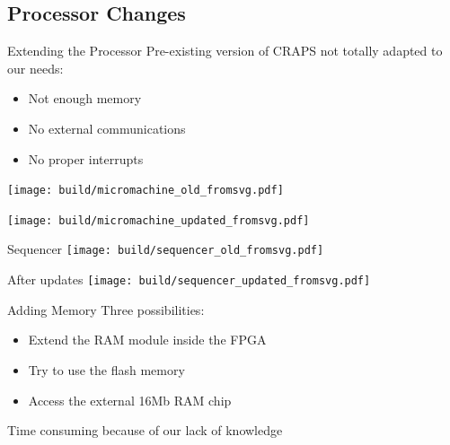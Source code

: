 \documentclass{beamer}
\begin{document}
    \subsection{Processor Changes}

          \begin{frame}{Extending the Processor}
          Pre-existing version of CRAPS not totally adapted to our needs:
          \begin{itemize}
            \item Not enough memory
            \item No external communications
            \item No proper interrupts
          \end{itemize}
      \end{frame}

      \begin{landscape}
        \begin{frame}[plain]
            \texttt{[image: build/micromachine\_old\_fromsvg.pdf]}

        \end{frame}
        \begin{frame}[plain]
            \texttt{[image: build/micromachine\_updated\_fromsvg.pdf]}

        \end{frame}
      \end{landscape}

      \begin{frame}{Sequencer}
          \texttt{[image: build/sequencer\_old\_fromsvg.pdf]}
      \end{frame}

      \begin{frame}[plain]{After updates}
            \texttt{[image: build/sequencer\_updated\_fromsvg.pdf]}
      \end{frame}



      \begin{frame}{Adding Memory}
          Three possibilities:
          \begin{itemize}
            \item Extend the RAM module inside the FPGA
            \item Try to use the flash memory
            \item Access the external 16Mb RAM chip
        \end{itemize}

          Time consuming because of our lack of knowledge
      \end{frame}
\end{document}

